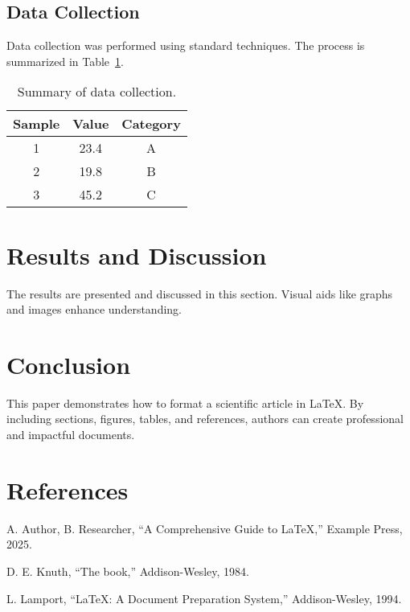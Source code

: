 \documentclass[twocolumn]{article}
\begin{document}
    \subsection{Data Collection}
    Data collection was performed using standard techniques. The process is summarized in Table~\ref{tab:data}.

    \begin{table}[h]
        \centering
        \begin{tabular}{|c|c|c|}
            \hline
            Sample & Value & Category \\
            \hline
            1      & 23.4  & A        \\
            2      & 19.8  & B        \\
            3      & 45.2  & C        \\
            \hline
        \end{tabular}
        \caption{Summary of data collection.}
        \label{tab:data}
    \end{table}

    \section{Results and Discussion}
    The results are presented and discussed in this section. Visual aids like graphs and images enhance understanding.


    \lipsum[5-6]

    \section{Conclusion}
    This paper demonstrates how to format a scientific article in \LaTeX. By including sections, figures, tables, and references, authors can create professional and impactful documents.

    \lipsum[7-8]

    \section*{References}
    \begin{thebibliography}{9}
         A. Author, B. Researcher, ``A Comprehensive Guide to \LaTeX,'' Example Press, 2025.

         D. E. Knuth, ``The book,'' Addison-Wesley, 1984.

         L. Lamport, ``\LaTeX: A Document Preparation System,'' Addison-Wesley, 1994.
    \end{thebibliography}
\end{document}
